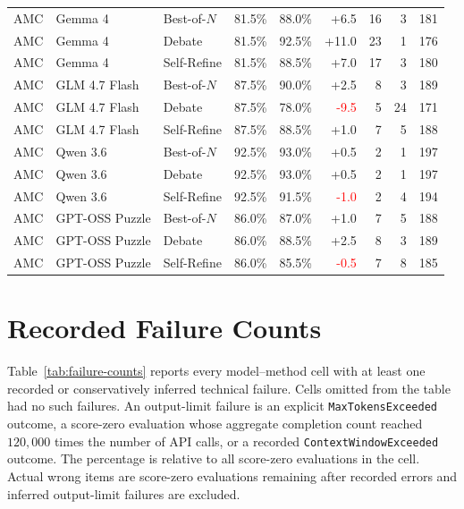 \begin{table}[H]
{\begin{tabular}{@{}lllrrrrrr@{}}
AMC & Gemma 4 & Best-of-$N$ & 81.5\% & 88.0\% & \textcolor{green!50!black}{+6.5} & 16 & 3 & 181 \\
AMC & Gemma 4 & Debate & 81.5\% & 92.5\% & \textcolor{green!50!black}{+11.0} & 23 & 1 & 176 \\
AMC & Gemma 4 & Self-Refine & 81.5\% & 88.5\% & \textcolor{green!50!black}{+7.0} & 17 & 3 & 180 \\
AMC & GLM 4.7 Flash & Best-of-$N$ & 87.5\% & 90.0\% & \textcolor{green!50!black}{+2.5} & 8 & 3 & 189 \\
AMC & GLM 4.7 Flash & Debate & 87.5\% & 78.0\% & \textcolor{red}{-9.5} & 5 & 24 & 171 \\
AMC & GLM 4.7 Flash & Self-Refine & 87.5\% & 88.5\% & \textcolor{green!50!black}{+1.0} & 7 & 5 & 188 \\
AMC & Qwen 3.6 & Best-of-$N$ & 92.5\% & 93.0\% & \textcolor{green!50!black}{+0.5} & 2 & 1 & 197 \\
AMC & Qwen 3.6 & Debate & 92.5\% & 93.0\% & \textcolor{green!50!black}{+0.5} & 2 & 1 & 197 \\
AMC & Qwen 3.6 & Self-Refine & 92.5\% & 91.5\% & \textcolor{red}{-1.0} & 2 & 4 & 194 \\
AMC & GPT-OSS Puzzle & Best-of-$N$ & 86.0\% & 87.0\% & \textcolor{green!50!black}{+1.0} & 7 & 5 & 188 \\
AMC & GPT-OSS Puzzle & Debate & 86.0\% & 88.5\% & \textcolor{green!50!black}{+2.5} & 8 & 3 & 189 \\
AMC & GPT-OSS Puzzle & Self-Refine & 86.0\% & 85.5\% & \textcolor{red}{-0.5} & 7 & 8 & 185 \\
\bottomrule
\end{tabular}}
\end{table}

\section{Recorded Failure Counts}

Table~\ref{tab:failure-counts} reports every model--method cell with at least one recorded or conservatively inferred technical failure.
Cells omitted from the table had no such failures.
An output-limit failure is an explicit \texttt{MaxTokensExceeded} outcome, a score-zero evaluation whose aggregate completion count reached \(120{,}000\) times the number of API calls, or a recorded \texttt{ContextWindowExceeded} outcome.
The percentage is relative to all score-zero evaluations in the cell.
Actual wrong items are score-zero evaluations remaining after recorded errors and inferred output-limit failures are excluded.

